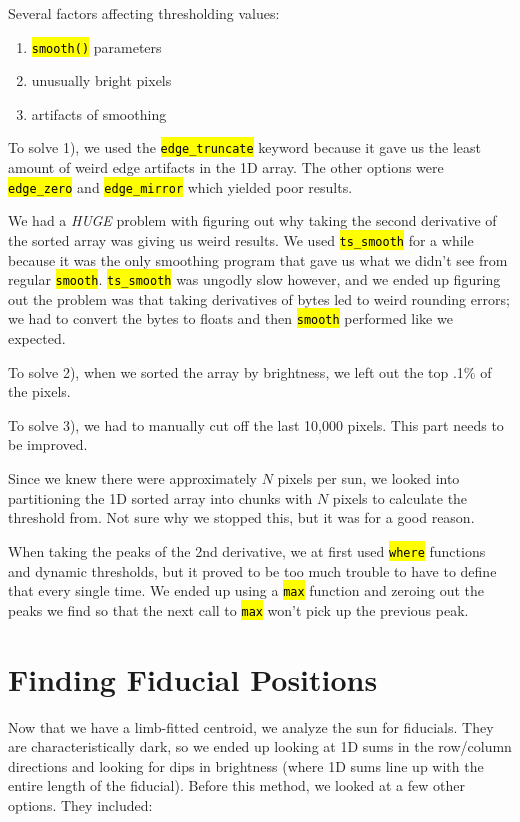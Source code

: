 \documentclass[10pt]{scrartcl}
\begin{document}
Several factors affecting thresholding values:

\begin{enumerate}
    \item \hl{\texttt{smooth()}} parameters
    \item unusually bright pixels
    \item artifacts of smoothing
\end{enumerate}

To solve 1), we used the \hl{\texttt{edge\_truncate}} keyword because it gave us the least amount of weird edge artifacts in the 1D array. The other options were \hl{\texttt{edge\_zero}} and \hl{\texttt{edge\_mirror}} which yielded poor results. 

We had a \emph{HUGE} problem with figuring out why taking the second derivative of the sorted array was giving us weird results. We used \hl{\texttt{ts\_smooth}} for a while because it was the only smoothing program that gave us what we didn't see from regular \hl{\texttt{smooth}}. \hl{\texttt{ts\_smooth}} was ungodly slow however, and we ended up figuring out the problem was that taking derivatives of bytes led to weird rounding errors; we had to convert the bytes to floats and then \hl{\texttt{smooth}} performed like we expected.

To solve 2), when we sorted the array by brightness, we left out the top .1\% of the pixels.

To solve 3), we had to manually cut off the last 10,000 pixels. This part needs to be improved.

Since we knew there were approximately $N$ pixels per sun, we looked into partitioning the 1D sorted array into chunks with $N$ pixels to calculate the threshold from. Not sure why we stopped this, but it was for a good reason.

When taking the peaks of the 2nd derivative, we at first used \hl{\texttt{where}} functions and dynamic thresholds, but it proved to be too much trouble to have to define that every single time. We ended up using a \hl{\texttt{max}} function and zeroing out the peaks we find so that the next call to \hl{\texttt{max}} won't pick up the previous peak.

\section{Finding Fiducial Positions} %
\label{sec:finding_fiducial_positions}

Now that we have a limb-fitted centroid, we analyze the sun for fiducials. They are characteristically dark, so we ended up looking at 1D sums in the row/column directions and looking for dips in brightness (where 1D sums line up with the entire length of the fiducial). Before this method, we looked at a few other options. They included:
\end{document}
